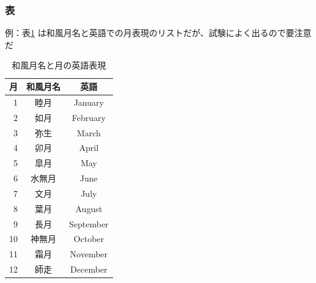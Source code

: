 \begin{frame}{}
  \frametitle{表}
    \begin{multicols}{2}

  例：表\ref{tab:month} は和風月名と英語での月表現のリストだが、試験によく出るので要注意だ
      \columnbreak
  \small
  \begin{table}[htb]
      \begin{center}
          \caption{和風月名と月の英語表現}
          \label{tab:month}
          \begin{tabular}{rcc}
              \hline
              月 & 和風月名 & 英語 \\
              \hline \hline
              1 & 睦月 &   January \\
              2 & 如月 &   February \\
              3 & 弥生 &   March \\
              4 & 卯月 &   April \\
              5 & 皐月 &   May	 \\
              6 & 水無月 & June \\
              7 & 文月 &   July \\
              8 & 葉月 &   August	 \\
              9 & 長月 &   September \\
              10 & 神無月 & October	 \\
              11 & 霜月 &  November  \\
              12 & 師走 &  December  \\
              \hline
          \end{tabular}
      \end{center}
  \end{table}
    \end{multicols}
\end{frame}

